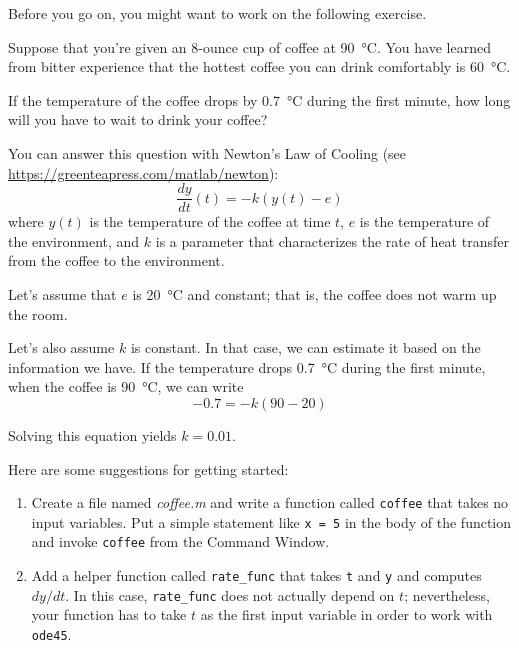 \documentclass[../../book.tex]{subfiles}
\begin{document}
Before you go on, you might want to work on the following exercise.

\begin{ex}


Suppose that you're given an 8-ounce cup of coffee at \SI{90}{\celsius}.
You have learned from bitter experience that the hottest coffee you
can drink comfortably is \SI{60}{\celsius}.

If the temperature of the coffee drops by \SI{0.7}{\celsius} during the first minute, how long will you have to wait to drink your coffee?

You can answer this question with Newton's Law of Cooling (see  \url{https://greenteapress.com/matlab/newton}):
%
\begin{equation*}
\frac{dy}{dt}(t) = -k (y(t) - e)
\end{equation*}
%
where $y(t)$ is the temperature of the coffee at time $t$,
$e$ is the temperature of the environment, and $k$ is a parameter
that characterizes the rate of heat transfer from the coffee to the environment.

Let's assume that $e$ is \SI{20}{\celsius} and constant; that is, the coffee does not warm up the room.

Let's also assume $k$ is constant.  In that case, we can estimate it based on the information we have.  If the temperature drops \SI{0.7}{\celsius} during the first minute, when the coffee is \SI{90}{\celsius}, we can write
%
\begin{equation*}
-0.7 = -k (90 - 20)
\end{equation*}
%

Solving this equation yields $k = 0.01$.

Here are some suggestions for getting started:

\begin{enumerate}

\item Create a file named \emph{coffee.m} and write a function
called \lstinline{coffee} that takes no input variables.  Put a simple statement like \lstinline{x = 5} in the body of the function and invoke \lstinline{coffee} from the Command  Window.

\item Add a helper function called \lstinline{rate_func} that takes \lstinline{t} and \lstinline{y} and computes $dy/dt$.  In this case, \lstinline{rate_func} does not actually depend on $t$; nevertheless, your function has to take $t$ as the first input variable in order to work with \lstinline{ode45}.


\end{enumerate}
\end{ex}
\end{document}
